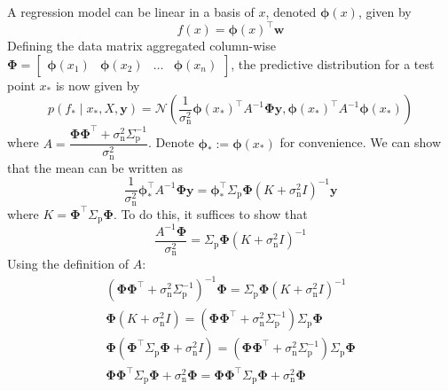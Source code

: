 \documentclass[11pt]{report} %
\begin{document}
A regression model can be linear in a basis of $x$, denoted $\boldsymbol{\phi}\left(x\right)$, given by
\begin{equation}
f\left(x\right)=\boldsymbol{\phi}\left(x\right)^{\top}\mathbf{w}
\end{equation}
Defining the data matrix aggregated column-wise $\boldsymbol{\Phi}=\begin{bmatrix}\boldsymbol{\phi}\left(x_{1}\right) & \boldsymbol{\phi}\left(x_{2}\right) & \dots & \boldsymbol{\phi}\left(x_{n}\right)\end{bmatrix}$, the predictive distribution for a test point $x_{*}$ is now given by
\begin{equation}
p\left(f_{*}\middle|x_{*},X,\mathbf{y}\right)=\mathcal{N}\left(\dfrac{1}{\sigma_{\mathrm{n}}^{2}}\boldsymbol{\phi}\left(x_{*}\right)^{\top}A^{-1}\boldsymbol{\Phi}\mathbf{y},\boldsymbol{\phi}\left(x_{*}\right)^{\top}A^{-1}\boldsymbol{\phi}\left(x_{*}\right)\right)
\end{equation}
where $A=\dfrac{\boldsymbol{\Phi}\boldsymbol{\Phi}^{\top}+\sigma_{\mathrm{n}}^{2}\Sigma_{\mathrm{p}}^{-1}}{\sigma_{\mathrm{n}}^{2}}$. Denote $\boldsymbol{\phi}_{*} := \boldsymbol{\phi}\left(x_{*}\right)$ for convenience. We can show that the mean can be written as
\begin{equation}
\dfrac{1}{\sigma_{\mathrm{n}}^{2}}\boldsymbol{\phi}_{*}^{\top}A^{-1}\boldsymbol{\Phi}\mathbf{y}=\boldsymbol{\phi}_{*}^{\top}\Sigma_{\mathrm{p}}\boldsymbol{\Phi}\left(K+\sigma_{\mathrm{n}}^{2}I\right)^{-1}\mathbf{y}
\end{equation}
where $K=\boldsymbol{\Phi}^{\top}\Sigma_{\mathrm{p}}\boldsymbol{\Phi}$. To do this, it suffices to show that
\begin{equation}
\dfrac{A^{-1}\boldsymbol{\Phi}}{\sigma_{\mathrm{n}}^{2}}=\Sigma_{\mathrm{p}}\boldsymbol{\Phi}\left(K+\sigma_{\mathrm{n}}^{2}I\right)^{-1}
\end{equation}
Using the definition of $A$:
\begin{gather}
\left(\boldsymbol{\Phi}\boldsymbol{\Phi}^{\top}+\sigma_{\mathrm{n}}^{2}\Sigma_{\mathrm{p}}^{-1}\right)^{-1}\boldsymbol{\Phi}=\Sigma_{\mathrm{p}}\boldsymbol{\Phi}\left(K+\sigma_{\mathrm{n}}^{2}I\right)^{-1} \\
\boldsymbol{\Phi}\left(K+\sigma_{\mathrm{n}}^{2}I\right)=\left(\boldsymbol{\Phi}\boldsymbol{\Phi}^{\top}+\sigma_{\mathrm{n}}^{2}\Sigma_{\mathrm{p}}^{-1}\right)\Sigma_{\mathrm{p}}\boldsymbol{\Phi} \\
\boldsymbol{\Phi}\left(\boldsymbol{\Phi}^{\top}\Sigma_{\mathrm{p}}\boldsymbol{\Phi}+\sigma_{\mathrm{n}}^{2}I\right)=\left(\boldsymbol{\Phi}\boldsymbol{\Phi}^{\top}+\sigma_{\mathrm{n}}^{2}\Sigma_{\mathrm{p}}^{-1}\right)\Sigma_{\mathrm{p}}\boldsymbol{\Phi} \\
\boldsymbol{\Phi}\boldsymbol{\Phi}^{\top}\Sigma_{\mathrm{p}}\boldsymbol{\Phi}+\sigma_{\mathrm{n}}^{2}\boldsymbol{\Phi}=\boldsymbol{\Phi}\boldsymbol{\Phi}^{\top}\Sigma_{\mathrm{p}}\boldsymbol{\Phi}+\sigma_{\mathrm{n}}^{2}\boldsymbol{\Phi}
\end{gather}
\end{document}
